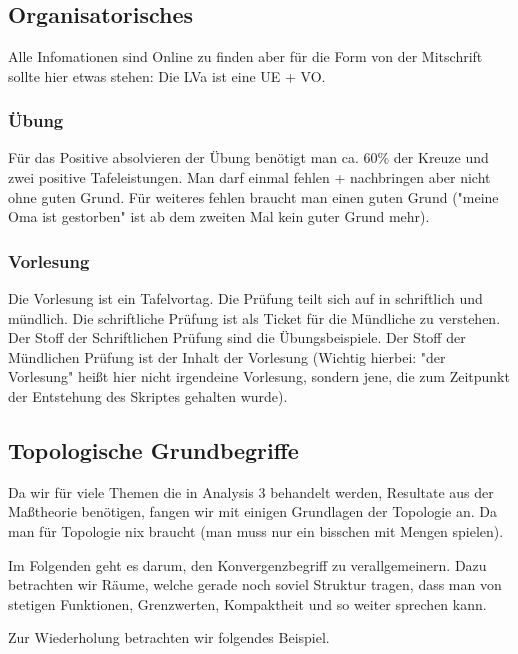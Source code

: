 \chapter{}
\section{Organisatorisches}
Alle Infomationen sind Online zu finden aber für die Form von der Mitschrift sollte hier etwas stehen:
Die LVa ist eine UE + VO. 
\subsection{Übung}
Für das Positive absolvieren der Übung benötigt man ca. 60\% der Kreuze und zwei positive Tafeleistungen.
Man darf einmal fehlen + nachbringen aber nicht ohne guten Grund.
Für weiteres fehlen braucht man einen guten Grund ("meine Oma ist gestorben"
ist ab dem zweiten Mal kein guter Grund mehr).
\subsection{Vorlesung}
Die Vorlesung ist ein Tafelvortag. 
Die Prüfung teilt sich auf in schriftlich und mündlich. Die schriftliche Prüfung ist als Ticket für die Mündliche zu verstehen.
Der Stoff der Schriftlichen Prüfung sind die Übungsbeispiele.
Der Stoff der Mündlichen Prüfung ist der Inhalt der Vorlesung (Wichtig hierbei: "der Vorlesung" heißt hier nicht irgendeine Vorlesung, sondern jene, die zum Zeitpunkt der Entstehung des Skriptes gehalten wurde).

\section{Topologische Grundbegriffe} 

Da wir für viele Themen die in Analysis 3 behandelt werden, Resultate aus der Maßtheorie benötigen,
fangen wir mit einigen Grundlagen der Topologie an. Da man für Topologie nix braucht (man muss nur ein bisschen mit Mengen spielen).

\bigskip

Im Folgenden geht es darum, den Konvergenzbegriff zu verallgemeinern. 
Dazu betrachten wir Räume, welche gerade noch soviel Struktur tragen, dass man von stetigen
Funktionen, Grenzwerten, Kompaktheit und so weiter sprechen kann.

Zur Wiederholung betrachten wir folgendes Beispiel. 

